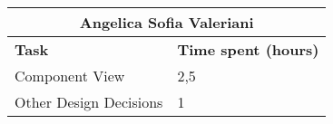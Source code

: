 \begin{table}[ht]
  \center
  \begin{tabular}{l|l}
    \multicolumn{2}{c}{\textbf{Angelica Sofia Valeriani}} \\
    \hline
    \textbf{Task} & \textbf{Time spent (hours)}\\
    \hline
    Component View & 2,5 \\
    Other Design Decisions & 1 \\
  \end{tabular}
\end{table}